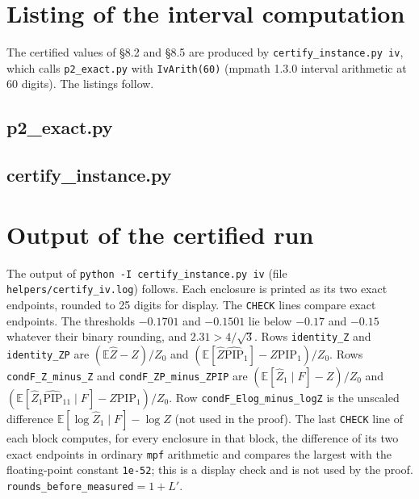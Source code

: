 \documentclass[11pt]{article}
\theoremstyle{remark}
\newcommand{\E}{\mathbb{E}}
\newcommand{\Zh}{\widehat Z}
\newcommand{\PIPh}{\widehat{\mathrm{PIP}}}
\newcommand{\PIP}{\mathrm{PIP}}
\begin{document}
\appendix
\section{Listing of the interval computation}\label{app:code}
The certified values of \S8.2 and \S8.5 are produced by \texttt{certify\_instance.py iv}, which calls \texttt{p2\_exact.py} with \texttt{IvArith(60)} (mpmath 1.3.0 interval arithmetic at 60 digits). The listings follow.

\subsection*{p2\_exact.py}

\subsection*{certify\_instance.py}


\section{Output of the certified run}\label{app:log}
The output of \texttt{python -I certify\_instance.py iv} (file \texttt{helpers/certify\_iv.log}) follows. Each enclosure is printed as its two exact endpoints, rounded to 25 digits for display. The \texttt{CHECK} lines compare exact endpoints. The thresholds $-0.1701$ and $-0.1501$ lie below $-0.17$ and $-0.15$ whatever their binary rounding, and $2.31>4/\sqrt3$. Rows \texttt{identity\_Z} and \texttt{identity\_ZP} are $(\E\Zh-Z)/Z_0$ and $(\E[\Zh\PIPh_1]-Z\PIP_1)/Z_0$. Rows \texttt{condF\_Z\_minus\_Z} and \texttt{condF\_ZP\_minus\_ZPIP} are $(\E[\Zh_1\mid F]-Z)/Z_0$ and $(\E[\Zh_1\PIPh_{11}\mid F]-Z\PIP_1)/Z_0$. Row \texttt{condF\_Elog\_minus\_logZ} is the unscaled difference $\E[\log\Zh_1\mid F]-\log Z$ (not used in the proof). The last \texttt{CHECK} line of each block computes, for every enclosure in that block, the difference of its two exact endpoints in ordinary \texttt{mpf} arithmetic and compares the largest with the floating-point constant \texttt{1e-52}; this is a display check and is not used by the proof. \texttt{rounds\_before\_measured}$=1+L'$.

\end{document}
